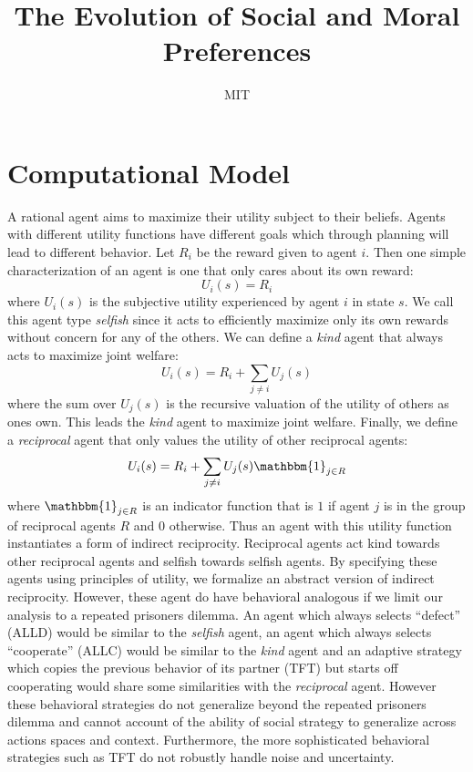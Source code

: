 \documentclass[doc, natbib]{apa6}
\title{The Evolution of Social and Moral Preferences}
\author{MIT}
\theoremstyle{definition}
\begin{document}
\maketitle

\section{Computational Model}

A rational agent aims to maximize their utility subject to their beliefs. Agents with different utility functions have different goals which through planning will lead to different behavior. Let $R_i$ be the reward given to agent $i$. Then one simple characterization of an agent is one that only cares about its own reward:
%
\begin{equation}
U_i(s) = R_i
\end{equation}
%
where $U_i(s)$ is the subjective utility experienced by agent $i$ in state $s$. We call this agent type \emph{selfish} since it acts to efficiently maximize only its own rewards without concern for any of the others. We can define a \emph{kind} agent that always acts to maximize joint welfare: 
%
\begin{equation}
U_i(s) = R_i + \sum_{j \neq i} U_j(s)
\end{equation}
%
where the sum over $U_j(s)$ is the recursive valuation of the utility of others as ones own. This leads the \emph{kind} agent to maximize joint welfare. Finally, we define a \emph{reciprocal} agent that only values the utility of other reciprocal agents:
%
\begin{equation}
U_i(s) = R_i + \sum_{j \neq i} U_j(s)\mathbbm{1}_{j \in R}
\end{equation}
%
where $\mathbbm{1}_{j \in R}$ is an indicator function that is $1$ if agent $j$ is in the group of reciprocal agents $R$ and $0$ otherwise. Thus an agent with this utility function instantiates a form of indirect reciprocity. Reciprocal agents act kind towards other reciprocal agents and selfish towards selfish agents. By specifying these agents using principles of utility, we formalize an abstract version of indirect reciprocity. However, these agent do have behavioral analogous if we limit our analysis to a repeated prisoners dilemma. An agent which always selects ``defect'' (ALLD) would be similar to the \emph{selfish} agent, an agent which always selects ``cooperate'' (ALLC) would be similar to the \emph{kind} agent and an adaptive strategy which copies the previous behavior of its partner (TFT) but starts off cooperating would share some similarities with the \emph{reciprocal} agent. However these behavioral strategies do not generalize beyond the repeated prisoners dilemma and cannot account of the ability of social strategy to generalize across actions spaces and context. Furthermore, the more sophisticated behavioral strategies such as TFT do not robustly handle noise and uncertainty. 
\end{document}
